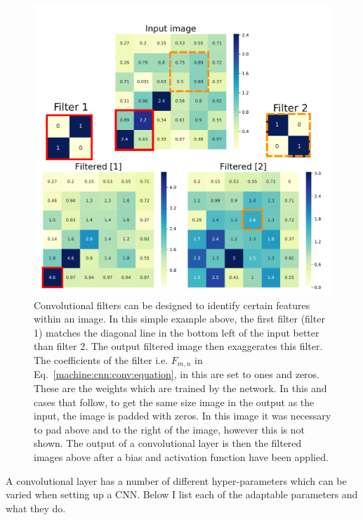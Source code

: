 \begin{figure}[p]

    \centering
    \includegraphics[width=\columnwidth]{C4_cnn/conv_filters.pdf}
    \caption[How convolutions are applied in convolutional neural networks.]{Convolutional filters can be designed to identify certain features within an image. In this simple example above, the first filter (filter 1) matches the diagonal line in the bottom left of the input better than filter 2. The output filtered image then exaggerates this filter. The coefficients of the filter i.e. $F_{m,n}$ in Eq.~\ref{machine:cnn:conv:equation}, in this are set to ones and zeros.
    These are the weights which are trained by the network. In this and cases that follow, to get the same size image in the output as the input, the image is padded with zeros. In this image it was necessary to pad above and to the right of the image, however this is not shown. The output of a convolutional layer is then the filtered images above after a bias and activation function have been applied. }
    \label{machine:cnn:convlayer:input}

\end{figure}

A convolutional layer has a number of different hyper-parameters which can be varied when setting up a \gls{CNN}.
Below I list each of the adaptable parameters and what they do.

